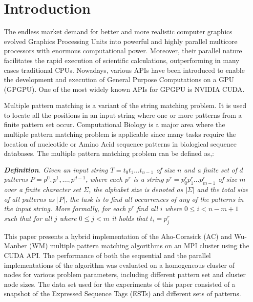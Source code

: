 \documentclass{ws-ijait}
\begin{document}

\section{Introduction}
\label{sec:introduction}
The endless market demand for better and more realistic computer graphics evolved Graphics Processing Units into powerful and highly parallel multicore processors with enormous computational power. Moreover, their parallel nature facilitates the rapid execution of scientific calculations, outperforming in many cases traditional CPUs. Nowadays, various APIs have been introduced to enable the development and execution of General Purpose Computations on a GPU \cite{gpgpuorg} (GPGPU). One of the most widely known APIs for GPGPU is NVIDIA CUDA.\cite{CUDA_SDK}

Multiple pattern matching is a variant of the string matching problem. It is used to locate all the positions in an input string where one or more patterns from a finite pattern set occur. Computational Biology is a major area where the multiple pattern matching problem is applicable since many tasks require the location of nucleotide or Amino Acid sequence patterns in biological sequence databases. The multiple pattern matching problem can be defined as,\cite{Kouzinopoulos2011}:

\textit {\textbf{Definition}. Given an input string $T = t_{0}t_{1}\ldots t_{n-1}$ of size $n$ and a finite set of $d$ patterns $P = {p^{0}, p^{1},\ldots, p^{d-1}}$, where each $p^{r}$ is a string $p^{r} = p^{r}_{0} p^{r}_{1}\ldots p^{r}_{m-1}$ of size $m$ over a finite character set $\Sigma$, the alphabet size is denoted as $|\Sigma|$ and the total size of all patterns as $|P|$, the task is to find all occurrences of any of the patterns in the input string. More formally, for each $p^r$ find all $i$ where $0 \leq i < n - m + 1$ such that for all $j$ where $0 \leq j < m$ it holds that $t_i = p^r_j$}

This paper presents a hybrid implementation of the Aho-Corasick \cite{Aho1975} (AC) and Wu-Manber \cite{Wu1994} (WM) multiple pattern matching algorithms on an MPI cluster using the CUDA API. The performance of both the sequential and the parallel implementations of the algorithm was evaluated on a homogeneous cluster of nodes for various problem parameters, including different pattern set and cluster node sizes. The data set used for the experiments of this paper consisted of a snapshot of the Expressed Sequence Tags (ESTs) and different sets of patterns.
\end{document}
